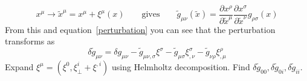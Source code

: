 \begin{equation}
    x^\mu \rightarrow \tilde{x}^{\mu} = x^{\mu} + \xi^{\mu}(x) \qquad \text{gives} \qquad \tilde{g}_{\mu\nu}(\tilde{x}) = \frac{\partial x^\rho}{\partial\tilde{x}^\mu}\frac{\partial x^\sigma}{\partial\tilde{x}^\nu}g_{\rho\sigma}(x)
\end{equation}
From this and equation~\eqref{perturbation} you can see that the perturbation transforms as
\begin{equation}
    \delta \tilde{g}_{\mu\nu} = \delta g_{\mu\nu} - \tilde{g}_{\mu\nu,\sigma} \xi^\sigma - \tilde{g}_{\mu\sigma} \xi^\sigma_{,\nu} - \tilde{g}_{\nu\rho} \xi^\rho_{,\mu} 
\end{equation}
Expand $\xi^\mu = \left(\xi^0,\xi^i_\perp+\xi^{,i}\right)$ using Helmholtz decomposition. Find $\delta \tilde{g}_{00}, \delta \tilde{g}_{0i}, \delta \tilde{g}_{ii} $.   


%
%    
